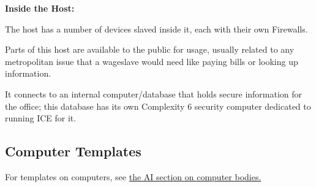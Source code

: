 \begin{multicols}{2}
	\textbf{Inside the Host:}
	
	The host has a number of devices slaved inside it, each with their own Firewalls. 
	
	Parts of this host are available to the public for usage, usually related to any metropolitan issue that a wageslave would need like paying bills or looking up information. 
	
	It connects to an internal computer/database that holds secure information for the office; this database has its own Complexity 6 security computer dedicated to running ICE for it.	
	
	\subsection*{Computer Templates}
	
	For templates on computers, see \hyperref[ai_computer]{the AI section on computer bodies.}
	
\end{multicols}